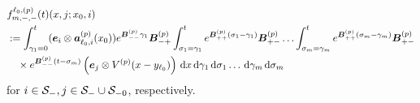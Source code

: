\begin{align}
	&f^{\ell_0,(p)}_{m,-,-}(t)( x, j; x_0, i) \nonumber
	\\&:=\int_{\gamma_1=0}^t (\boldsymbol e_i\otimes \boldsymbol  a_{\ell_0,i}^{(p)}(x_0)) e^{\boldsymbol{B}^{(p)}_{--}\gamma_1}\boldsymbol{B}^{(p)}_{-+}	\nonumber
	\int_{\sigma_1=\gamma_1}^{t} e^{\boldsymbol{B}^{(p)}_{++}(\sigma_1-\gamma_1)}\boldsymbol{B}^{(p)}_{+-}
	\hdots 
	 \int_{\sigma_m=\gamma_{m}}^{t} e^{\boldsymbol{B}^{(p)}_{++}(\sigma_m-\gamma_{m})}\boldsymbol{B}^{(p)}_{+-}\\&\quad\times
	e^{\boldsymbol{B}^{(p)}_{--}(t-\sigma_m)}\left(\boldsymbol e_j  \otimes V^{(p)}(x-y_{\ell_0})\right)\, \mathrm{d} x
	\, \mathrm{d} \gamma_1\, \mathrm{d} \sigma_1\dots \, \mathrm{d} \gamma_m\, \mathrm{d} \sigma_m\label{eqn: 67}
\end{align}
for \( i\in\mathcal{S}_-,j\in\mathcal S_-\cup\mathcal{S}_{-0}\), respectively. %


